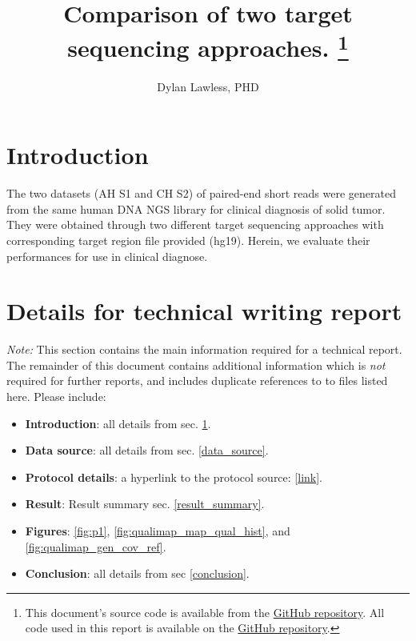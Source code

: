 \documentclass{article}
\begin{document}
\date{} %
\title{\Large \bf Comparison of two target sequencing approaches.
\footnote{This document's source code is available from the 
\href{https://github.com/DylanLawless/kit_assess/blob/master/latex/report.tex}{GitHub repository}.
All code used in this report is available on the 
\href{https://github.com/DylanLawless/kit_assess}{GitHub repository}.}
}

\author[1]{\rm Dylan Lawless, PHD}
\maketitle


\section{Introduction}
\label{intro}
The two datasets (AH S1 and CH S2) of paired-end short reads were generated from the same human DNA NGS library for clinical diagnosis of solid tumor. 
They were obtained through two different target sequencing approaches with corresponding target region file provided (hg19). 
Herein, we evaluate their performances for use in clinical diagnose.

\section{Details for technical writing report}
\textit{Note:}
This section contains the main information required for a technical report.
The remainder of this document contains additional information which is \textit{not} required for further reports, and includes duplicate references to to files listed here.
Please include:

\begin{itemize}
\item \textbf{Introduction}: all details from sec. \ref{intro}.
\item \textbf{Data source}: all details from sec. \ref{data_source}.
\item \textbf{Protocol details}: a hyperlink to the protocol source: [\href{https://github.com/DylanLawless/kit_assess/README.md}{link}].
\item \textbf{Result}: Result summary sec. \ref{result_summary}.
\item \textbf{Figures}: \ref{fig:p1}, \ref{fig:qualimap_map_qual_hist},  and \ref{fig:qualimap_gen_cov_ref}.
\item \textbf{Conclusion}: all details from sec \ref{conclusion}.
\end{itemize}
\end{document}

